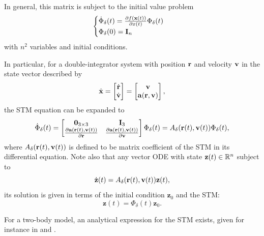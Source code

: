 In general, this matrix is subject to the initial value problem~\cite{montenbruck2000satellite}
\begin{equation}
    \begin{cases}
        \dot{\Phi}_\delta(t) = \frac{\partial f(\mathbf{x}(t))}{\partial x(t)} \Phi_\delta(t) \\
        \Phi_\delta(0) = \mathbf{I}_n
    \end{cases}
\end{equation}
with \(n^2\) variables and initial conditions.

In particular, for a double-integrator system with position \(\mathbf{r}\) and velocity \(\mathbf{v}\) in the state vector described by
\begin{equation}
    \dot{\mathbf{x}} = \begin{bmatrix}
        \dot{\mathbf{r}} \\ \dot{\mathbf{v}}
    \end{bmatrix} = \begin{bmatrix}
        \mathbf{v} \\ \mathbf{a}(\mathbf{r}, \mathbf{v})
    \end{bmatrix},
\end{equation}
the STM equation can be expanded to
\begin{equation}\label{eq:STM_r_v}
    \dot{\Phi}_\delta(t) = \begin{bmatrix}
        \mathbf{0}_{3\times 3} & \mathbf{I}_3 \\
        \frac{\partial \acc(\pos(t), \vel(t))}{\partial \pos} & \frac{\partial \acc(\pos(t), \vel(t))}{\partial \vel}
    \end{bmatrix} \Phi_\delta(t) = A_\delta(\pos(t), \vel(t)) \Phi_\delta(t),
\end{equation}
where \(A_\delta(\mathbf{r}(t), \mathbf{v}(t))\) is defined to be matrix coefficient of the STM in its differential equation. Note also that any vector ODE with state \(\mathbf{z}(t) \in \mathbb{R}^n\) subject to
\begin{equation}
    \dot{\mathbf{z}}(t) = A_\delta(\mathbf{r}(t), \mathbf{v}(t)) \mathbf{z}(t),
\end{equation}
its solution is given in terms of the initial condition \(\mathbf{z}_0\) and the STM:
\begin{equation}\label{eq:remark_STM}
    \mathbf{z}(t) = \Phi_\delta(t) \mathbf{z}_0.
\end{equation}

For a two-body model, an analytical expression for the STM exists, given for instance in  and . 

